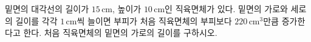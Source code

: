 밑면의 대각선의 길이가 $15\,\mathrm{cm}$, 높이가 $10\,\mathrm{cm}$인 직육면체가 있다. 밑면의 가로와 세로의 길이를 각각 $1\,\mathrm{cm}$씩 늘이면 부피가 처음 직육면체의 부피보다 $220\,\mathrm{cm}^3$만큼 증가한다고 한다. 처음 직육면체의 밑면의 가로의 길이를 구하시오. 
